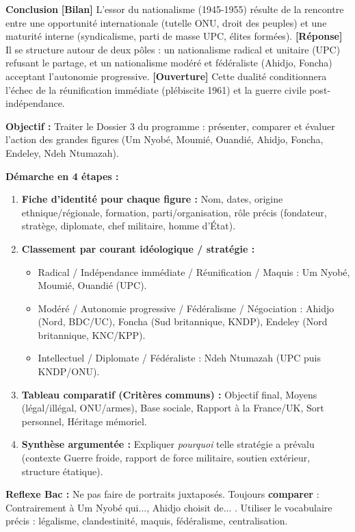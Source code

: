 \documentclass[11pt]{article}
\newcommand{\cle}[1]{{\popxbold\color{popdark}#1}}
\begin{document}
\begin{exoresolu}
\textbf{Conclusion}
\textbf{[Bilan]} L'essor du nationalisme (1945-1955) résulte de la rencontre entre une \cle{opportunité internationale} (tutelle ONU, droit des peuples) et une \cle{maturité interne} (syndicalisme, parti de masse UPC, élites formées). \textbf{[Réponse]} Il se structure autour de deux pôles : un nationalisme \cle{radical et unitaire} (UPC) refusant le partage, et un nationalisme \cle{modéré et fédéraliste} (Ahidjo, Foncha) acceptant l'autonomie progressive. \textbf{[Ouverture]} Cette dualité conditionnera l'échec de la réunification immédiate (plébiscite 1961) et la guerre civile post-indépendance.
\end{exoresolu}

\begin{methode}
\textbf{Objectif :} Traiter le \guillemotleft Dossier 3 \guillemotright du programme : présenter, comparer et évaluer l'action des grandes figures (Um Nyobé, Moumié, Ouandié, Ahidjo, Foncha, Endeley, Ndeh Ntumazah).\par
\textbf{Démarche en 4 étapes :}
\begin{enumerate}
    \item \textbf{Fiche d'identité pour chaque figure :} Nom, dates, origine ethnique/régionale, formation, parti/organisation, rôle précis (fondateur, stratège, diplomate, chef militaire, homme d'État).
    \item \textbf{Classement par courant idéologique / stratégie :}
        \begin{itemize}
            \item \cle{Radical / Indépendance immédiate / Réunification / Maquis} : Um Nyobé, Moumié, Ouandié (UPC).
            \item \cle{Modéré / Autonomie progressive / Fédéralisme / Négociation} : Ahidjo (Nord, BDC/UC), Foncha (Sud britannique, KNDP), Endeley (Nord britannique, KNC/KPP).
            \item \cle{Intellectuel / Diplomate / Fédéraliste} : Ndeh Ntumazah (UPC puis KNDP/ONU).
        \end{itemize}
    \item \textbf{Tableau comparatif (Critères communs) :} Objectif final, Moyens (légal/illégal, ONU/armes), Base sociale, Rapport à la France/UK, Sort personnel, Héritage mémoriel.
    \item \textbf{Synthèse argumentée :} Expliquer \emph{pourquoi} telle stratégie a prévalu (contexte Guerre froide, rapport de force militaire, soutien extérieur, structure étatique).
\end{enumerate}
\textbf{Reflexe Bac :} Ne pas faire de \guillemotleft portraits \guillemotright juxtaposés. Toujours \textbf{comparer} : \guillemotleft Contrairement à Um Nyobé qui..., Ahidjo choisit de... \guillemotright. Utiliser le vocabulaire précis : \cle{légalisme}, \cle{clandestinité}, \cle{maquis}, \cle{fédéralisme}, \cle{centralisation}.
\end{methode}
\end{document}
